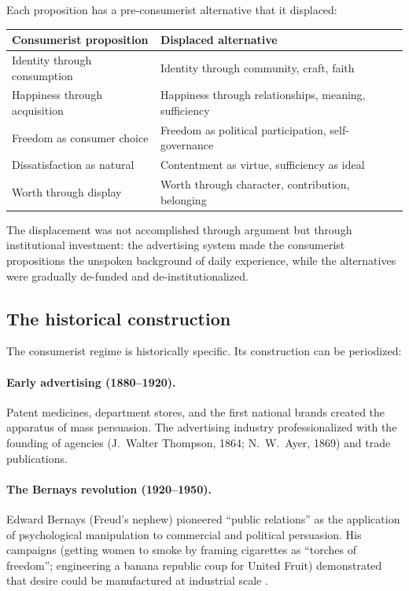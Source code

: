Each proposition has a pre-consumerist alternative that it displaced:
\begin{center}
\begin{tabular}{ll}
\toprule
Consumerist proposition & Displaced alternative \\
\midrule
Identity through consumption & Identity through community, craft, faith \\
Happiness through acquisition & Happiness through relationships, meaning, sufficiency \\
Freedom as consumer choice & Freedom as political participation, self-governance \\
Dissatisfaction as natural & Contentment as virtue, sufficiency as ideal \\
Worth through display & Worth through character, contribution, belonging \\
\bottomrule
\end{tabular}
\end{center}

The displacement was not accomplished through argument but through institutional investment: the advertising system made the consumerist propositions the unspoken background of daily experience, while the alternatives were gradually de-funded and de-institutionalized.

\subsection{The historical construction}

The consumerist regime is historically specific.
Its construction can be periodized:

\paragraph{Early advertising (1880--1920).}
Patent medicines, department stores, and the first national brands created the apparatus of mass persuasion.
The advertising industry professionalized with the founding of agencies (J.\ Walter Thompson, 1864; N.\ W.\ Ayer, 1869) and trade publications.

\paragraph{The Bernays revolution (1920--1950).}
Edward Bernays (Freud's nephew) pioneered ``public relations'' as the application of psychological manipulation to commercial and political persuasion.
His campaigns (getting women to smoke by framing cigarettes as ``torches of freedom''; engineering a banana republic coup for United Fruit) demonstrated that desire could be manufactured at industrial scale \autocite{bernays1928}.

